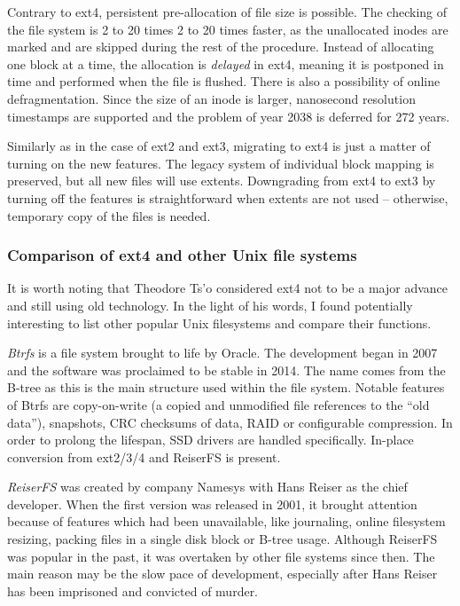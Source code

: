 \documentclass{acm_proc_article-sp}
\begin{document}
Contrary to ext4, persistent pre-allocation of file size is possible. The checking of the file system is 2 to 20 times 2 to 20 times faster, as the unallocated inodes are marked and are skipped during the rest of the procedure. Instead of allocating one block at a time, the allocation is {\it delayed} in ext4, meaning it is postponed in time and performed when the file is flushed. There is also a possibility of online defragmentation. Since the size of an inode is larger, nanosecond resolution timestamps are supported and the problem of year 2038 is deferred for 272 years.

Similarly as in the case of ext2 and ext3, migrating to ext4 is just a matter of turning on the new features. The legacy system of individual block mapping is preserved, but all new files will use extents. Downgrading from ext4 to ext3 by turning off the features is straightforward when extents are not used -- otherwise, temporary copy of the files is needed.

\subsubsection{Comparison of ext4 and other Unix file systems}

It is worth noting that Theodore Ts'o considered ext4 not to be a major advance and still using old technology. In the light of his words, I found potentially interesting to list other popular Unix filesystems and compare their functions.

{\it Btrfs} \cite{btrfs} is a file system brought to life by Oracle. The development began in 2007 and the software was proclaimed to be stable in 2014. The name comes from the B-tree as this is the main structure used within the file system. Notable features of Btrfs are copy-on-write (a copied and unmodified file references to the ``old data''), snapshots, CRC checksums of data, RAID or configurable compression. In order to prolong the lifespan, SSD drivers are handled specifically. In-place conversion from ext2/3/4 and ReiserFS is present.

{\it ReiserFS} was created by company Namesys with Hans Reiser as the chief developer. When the first version was released in 2001, it brought attention because of features which had been unavailable, like journaling, online filesystem resizing, packing files in a single disk block or B-tree usage. Although ReiserFS was popular in the past, it was overtaken by other file systems since then. The main reason may be the slow pace of development, especially after Hans Reiser has been imprisoned and convicted of murder.
\end{document}
